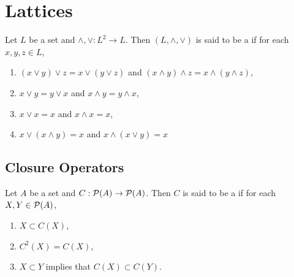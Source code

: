 \documentclass{book}
\begin{document}
	
	
	
	
	
	
	
	
	
	
	
	
	
	
	
	
	
	
	
	
	
	
	
	
	
	
	
	
	
	
	
	
	
	
	
	
	
	
	
	
	
	
	
	\newpage
	\chapter{Lattices}
	
	\begin{defn}
		Let $L$ be a set and $\wedge, \vee: L^2 \rightarrow L$. Then $(L, \wedge, \vee)$ is said to be a  if for each $x,y,z \in L$,
		\begin{enumerate}
			\item $(x \vee y) \vee z = x \vee (y \vee z)$ and $(x \wedge y) \wedge z = x \wedge (y \wedge z)$,
			\item $x \vee y = y \vee x$ and $x \wedge y = y \wedge x$,
			\item $x \vee x = x$ and $x \wedge x = x$,
			\item $x \vee (x \wedge y) = x$ and $x \wedge (x \vee y) = x$
		\end{enumerate}
	\end{defn}
	
	
	
	
	
	\section{Closure Operators}
	
	\begin{defn}
		Let $A$ be a set and $C: \mathcal{P}(A) \rightarrow \mathcal{P}(A)$. Then $C$ is said to be a  if for each $X, Y \in \mathcal{P}(A)$,
		\begin{enumerate}
			\item $X \subset C(X)$,
			\item $C^2(X) = C(X)$,
			\item $X \subset Y$ implies that $C(X) \subset C(Y)$.
		\end{enumerate}
	\end{defn}
\end{document}

